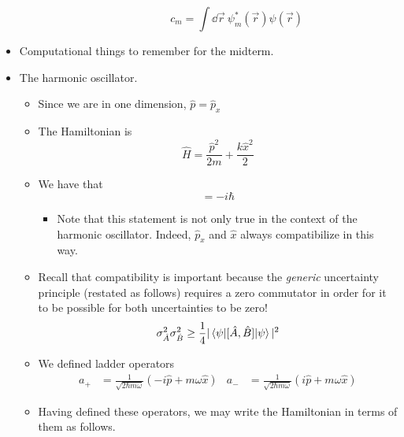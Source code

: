 \documentclass[../notes.tex]{subfiles}
\begin{document}
\begin{itemize}
\begin{itemize}
\begin{itemize}
\begin{itemize}
                \begin{equation*}
                    c_m = \int\dd{\vec{r}}\ \psi_m^*(\vec{r})\psi(\vec{r})
                \end{equation*}
            \end{itemize}
        \end{itemize}
    \end{itemize}
    \pagebreak
    \item Computational things to remember for the midterm.
    \item The harmonic oscillator.
    \begin{itemize}
        \item Since we are in one dimension, $\hat{p}=\hat{p}_x$
        \item The Hamiltonian is
        \begin{equation*}
            \hat{H} = \frac{\hat{p}^2}{2m}+\frac{k\hat{x}^2}{2}
        \end{equation*}
        \item We have that
        \begin{equation*}
            [\hat{p},\hat{x}] = -i\hbar
        \end{equation*}
        \begin{itemize}
            \item Note that this statement is not only true in the context of the harmonic oscillator. Indeed, $\hat{p}_x$ and $\hat{x}$ always compatibilize in this way.
        \end{itemize}
        \item Recall that compatibility is important because the \emph{generic} uncertainty principle (restated as follows) requires a zero commutator in order for it to be possible for both uncertainties to be zero!
        \begin{equation*}
            \sigma_{\hat{A}}^2\sigma_{\hat{B}}^2 \geq \frac{1}{4}|\ev{[\hat{A},\hat{B}]}{\psi}|^2
        \end{equation*}
        \item We defined ladder operators
        \begin{align*}
            a_+ &= \frac{1}{\sqrt{2\hbar m\omega}}(-i\hat{p}+m\omega\hat{x})&
            a_- &= \frac{1}{\sqrt{2\hbar m\omega}}(i\hat{p}+m\omega\hat{x})
        \end{align*}
        \item Having defined these operators, we may write the Hamiltonian in terms of them as follows.
        \begin{equation*}

\end{equation*}
\end{itemize}
\end{itemize}
\end{document}
